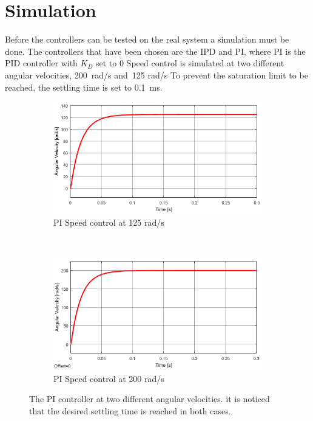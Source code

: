 \section{Simulation}
Before the controllers can be tested on the real system a simulation must be done. The controllers that have been chosen are the IPD and PI, where PI is the PID controller with $K_D$ set to 0 Speed control is simulated at two different angular velocities, 200~rad/s and~125 rad/s To prevent the saturation limit to be reached, the settling time is set to 0.1~ms.

\begin{figure}[h!]
	\centering
	\begin{subfigure}[b]{0.45\textwidth}
		\includegraphics[width=\textwidth]{graphics/PI_single125}
		\caption{PI Speed control at 125 rad/s}
		\label{fig:pisingle125}
	\end{subfigure}
	~ %
	\begin{subfigure}[b]{0.45\textwidth}
		\includegraphics[width=\textwidth]{graphics/PI_single200}
		\caption{PI Speed control at 200 rad/s}
		\label{fig:pisingle200}
	\end{subfigure}
	\caption{The PI controller at two different angular velocities. it is noticed that the desired settling time is reached in both cases.}\label{fig:pisingle}
\end{figure}






